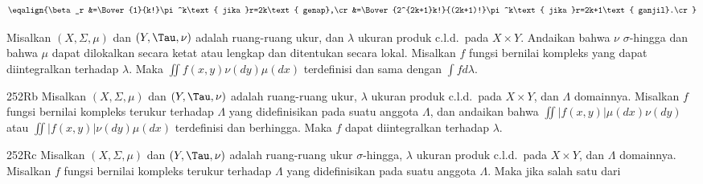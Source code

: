 $$\eqalign{\beta_r
&=\Bover{1}{k!}\pi^k\text{ jika }r=2k\text{ genap},\cr
&=\Bover{2^{2k+1}k!}{(2k+1)!}\pi^k\text{ jika }r=2k+1\text{ ganjil}.\cr}$$



 Misalkan $(X,\Sigma,\mu)$ dan $(Y,\Tau,\nu)$ adalah
ruang-ruang ukur, dan $\lambda$ ukuran produk c.l.d.\ pada $X\times
Y$. Andaikan bahwa $\nu$ $\sigma$-hingga dan bahwa $\mu$ dapat
dilokalkan secara ketat atau lengkap dan ditentukan secara lokal. Misalkan $f$
fungsi bernilai kompleks yang dapat diintegralkan terhadap $\lambda$. Maka
$\iint f(x,y)\nu(dy)\mu(dx)$ terdefinisi dan sama dengan $\int fd\lambda$.

\spheader 252Rb Misalkan $(X,\Sigma,\mu)$ dan $(Y,\Tau,\nu)$
adalah ruang-ruang ukur, $\lambda$ ukuran produk c.l.d.\ pada $X\times
Y$, dan $\Lambda$ domainnya.
Misalkan $f$ fungsi bernilai kompleks terukur terhadap $\Lambda$ yang didefinisikan
pada suatu anggota $\Lambda$, dan andaikan bahwa
$\iint|f(x,y)|\mu(dx)\nu(dy)$ atau $\iint|f(x,y)|\nu(dy)\mu(dx)$
terdefinisi dan berhingga. Maka $f$ dapat diintegralkan terhadap $\lambda$.

\spheader 252Rc Misalkan $(X,\Sigma,\mu)$ dan $(Y,\Tau,\nu)$ adalah
ruang-ruang ukur $\sigma$-hingga, $\lambda$ ukuran produk c.l.d.\
pada $X\times Y$, dan $\Lambda$ domainnya. Misalkan $f$ fungsi bernilai
kompleks terukur terhadap $\Lambda$ yang didefinisikan pada suatu anggota
$\Lambda$. Maka jika salah satu dari


